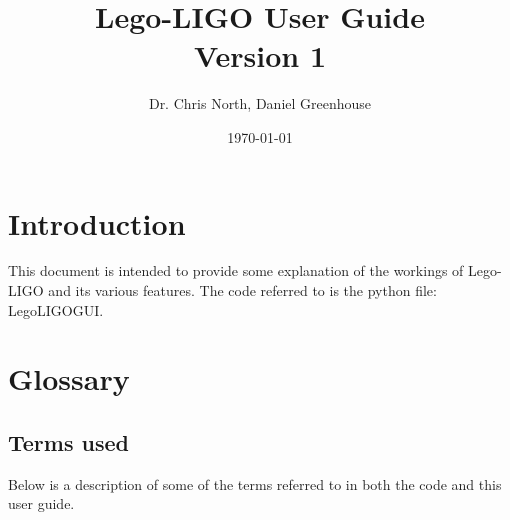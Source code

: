 \documentclass[a4paper, 12pt]{book}
\begin{document}
\title{Lego-LIGO User Guide \\  \large  Version 1}
\author{Dr. Chris North, Daniel Greenhouse}
\date{\today}
\maketitle

\section{Introduction}
This document is intended to provide some explanation of the workings of Lego-LIGO and its various features. The code referred  to is the python file: Lego{\textunderscore}LIGO{\textunderscore}GUI.


\section{Glossary}
\label{Glossary}
\subsection{Terms used}
Below is a description of some of the terms referred  to in both the code and this user guide.
\end{document}
